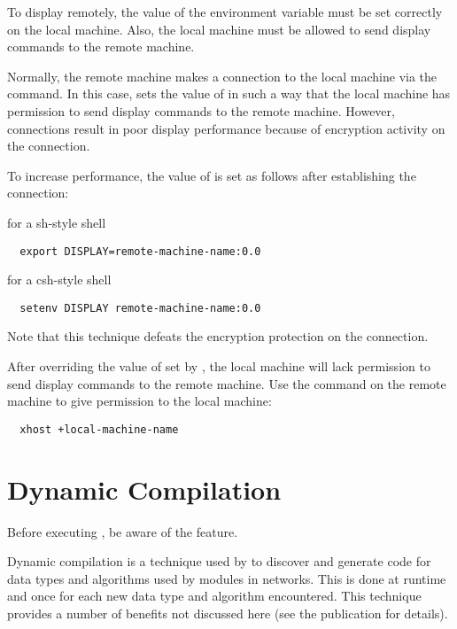 To display \sr{} remotely, the value of the 
environment variable must be set correctly on the local machine.
Also, the local machine must be allowed to send display commands to
the remote machine.
  
Normally, the remote machine makes a connection to the local machine
via the  command.  In this case,  sets the value of
 in such a way that the local machine has permission to
send display commands to the remote machine.  However, 
connections result in poor display performance because of encryption
activity on the connection.

To increase performance, the value of  is set as
follows after establishing the  connection:

for a sh-style shell

\begin{verbatim}
  export DISPLAY=remote-machine-name:0.0
\end{verbatim}
  
for a csh-style shell

\begin{verbatim}
  setenv DISPLAY remote-machine-name:0.0
\end{verbatim}

Note that this technique defeats the encryption protection on the
connection.

After overriding the value of  set by ,
the local machine will lack permission to send display commands to the
remote machine.  Use the  command on the remote machine
to give permission to the local machine:

\begin{verbatim}
  xhost +local-machine-name
\end{verbatim}
  

\section{Dynamic Compilation}
\label{sec:dyncomp}

Before executing \sr{},  be aware of the
 feature.

Dynamic compilation is a technique used by \sr{} to discover and
generate code for data types and algorithms used by modules in
networks.  This is done at runtime and once for each new
data type and algorithm encountered.  This technique provides a number
of benefits not discussed here (see the publication 
for details).

